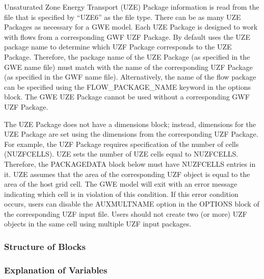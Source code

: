 Unsaturated Zone Energy Transport (UZE) Package information is read from the file that is specified by ``UZE6'' as the file type.  There can be as many UZE Packages as necessary for a GWE model. Each UZE Package is designed to work with flows from a corresponding GWF UZF Package. By default \mf uses the UZE package name to determine which UZF Package corresponds to the UZE Package.  Therefore, the package name of the UZE Package (as specified in the GWE name file) must match with the name of the corresponding UZF Package (as specified in the GWF name file).  Alternatively, the name of the flow package can be specified using the FLOW\_PACKAGE\_NAME keyword in the options block.  The GWE UZE Package cannot be used without a corresponding GWF UZF Package.

The UZE Package does not have a dimensions block; instead, dimensions for the UZE Package are set using the dimensions from the corresponding UZF Package.  For example, the UZF Package requires specification of the number of cells (NUZFCELLS).  UZE sets the number of UZE cells equal to NUZFCELLS.  Therefore, the PACKAGEDATA block below must have NUZFCELLS entries in it.  UZE assumes that the area of the corresponding UZF object is equal to the area of the host grid cell.  The GWE model will exit with an error message indicating which cell is in violation of this condition. If this error condition occurs, users can disable the AUXMULTNAME option in the OPTIONS block of the corresponding UZF input file.  Users should not create two (or more) UZF objects in the same cell using multiple UZF input packages.

\vspace{5mm}
\subsubsection{Structure of Blocks}




\vspace{5mm}
\subsubsection{Explanation of Variables}
\begin{description}

\end{description}

